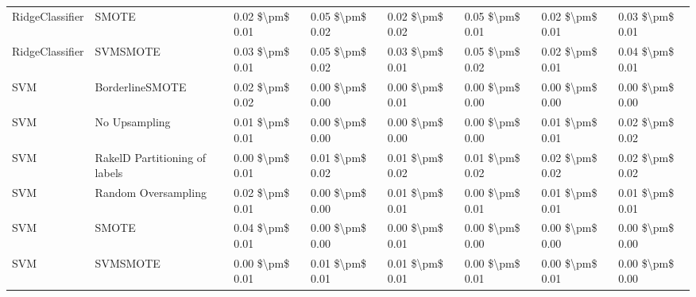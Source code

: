 \begin{tabular}{llllllll}
                RidgeClassifier &                         SMOTE & 0.02 \$\textbackslash pm\$ 0.01 &           0.05 \$\textbackslash pm\$ 0.02 &       0.02 \$\textbackslash pm\$ 0.02 &        0.05 \$\textbackslash pm\$ 0.01 &                         0.02 \$\textbackslash pm\$ 0.01 & 0.03 \$\textbackslash pm\$ 0.01 \\
                RidgeClassifier &                      SVMSMOTE & 0.03 \$\textbackslash pm\$ 0.01 &           0.05 \$\textbackslash pm\$ 0.02 &       0.03 \$\textbackslash pm\$ 0.01 &        0.05 \$\textbackslash pm\$ 0.02 &                         0.02 \$\textbackslash pm\$ 0.01 & 0.04 \$\textbackslash pm\$ 0.01 \\
                            SVM &               BorderlineSMOTE & 0.02 \$\textbackslash pm\$ 0.02 &           0.00 \$\textbackslash pm\$ 0.00 &       0.00 \$\textbackslash pm\$ 0.01 &        0.00 \$\textbackslash pm\$ 0.00 &                         0.00 \$\textbackslash pm\$ 0.00 & 0.00 \$\textbackslash pm\$ 0.00 \\
                            SVM &                 No Upsampling & 0.01 \$\textbackslash pm\$ 0.01 &           0.00 \$\textbackslash pm\$ 0.00 &       0.00 \$\textbackslash pm\$ 0.00 &        0.00 \$\textbackslash pm\$ 0.00 &                         0.01 \$\textbackslash pm\$ 0.01 & 0.02 \$\textbackslash pm\$ 0.02 \\
                            SVM & RakelD Partitioning of labels & 0.00 \$\textbackslash pm\$ 0.01 &           0.01 \$\textbackslash pm\$ 0.02 &       0.01 \$\textbackslash pm\$ 0.02 &        0.01 \$\textbackslash pm\$ 0.02 &                         0.02 \$\textbackslash pm\$ 0.02 & 0.02 \$\textbackslash pm\$ 0.02 \\
                            SVM &           Random Oversampling & 0.02 \$\textbackslash pm\$ 0.01 &           0.00 \$\textbackslash pm\$ 0.00 &       0.01 \$\textbackslash pm\$ 0.01 &        0.00 \$\textbackslash pm\$ 0.01 &                         0.01 \$\textbackslash pm\$ 0.01 & 0.01 \$\textbackslash pm\$ 0.01 \\
                            SVM &                         SMOTE & 0.04 \$\textbackslash pm\$ 0.01 &           0.00 \$\textbackslash pm\$ 0.00 &       0.00 \$\textbackslash pm\$ 0.01 &        0.00 \$\textbackslash pm\$ 0.00 &                         0.00 \$\textbackslash pm\$ 0.00 & 0.00 \$\textbackslash pm\$ 0.00 \\
                            SVM &                      SVMSMOTE & 0.00 \$\textbackslash pm\$ 0.01 &           0.01 \$\textbackslash pm\$ 0.01 &       0.01 \$\textbackslash pm\$ 0.01 &        0.00 \$\textbackslash pm\$ 0.01 &                         0.00 \$\textbackslash pm\$ 0.01 & 0.00 \$\textbackslash pm\$ 0.00 \\

\end{tabular}
